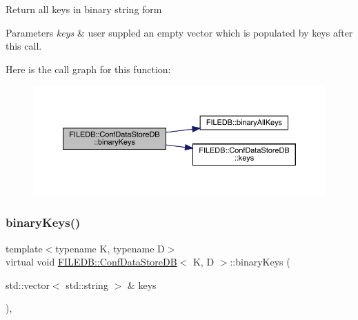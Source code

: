 Return all keys in binary string form 
\begin{DoxyParams}{Parameters}
{\em keys} & user suppled an empty vector which is populated by keys after this call. \\
\hline
\end{DoxyParams}
Here is the call graph for this function\+:
\nopagebreak
\begin{figure}[H]
\begin{center}
\leavevmode
\includegraphics[width=350pt]{d8/d19/classFILEDB_1_1ConfDataStoreDB_a1d0e8e27cd8fc6b24ece52259d1ab2b0_cgraph}
\end{center}
\end{figure}
\mbox{\label{classFILEDB_1_1ConfDataStoreDB_a1d0e8e27cd8fc6b24ece52259d1ab2b0}} 
\subsubsection{\texorpdfstring{binaryKeys()}{binaryKeys()}\hspace{0.1cm}{\footnotesize\ttfamily [3/3]}}
{\footnotesize\ttfamily template$<$typename K, typename D$>$ \\
virtual void \mbox{\hyperlink{classFILEDB_1_1ConfDataStoreDB}{F\+I\+L\+E\+D\+B\+::\+Conf\+Data\+Store\+DB}}$<$ K, D $>$\+::binary\+Keys (\begin{DoxyParamCaption}\item[{std\+::vector$<$ std\+::string $>$ \&}]{keys }\end{DoxyParamCaption})\hspace{0.3cm}{\ttfamily [inline]}, {\ttfamily [virtual]}}

